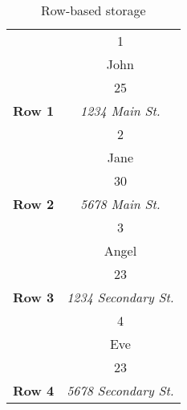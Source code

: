 \begin{table}[ht]
    \centering
    \begin{tabular}{|c|c|}
        \hline
        \multicolumn{1}{|l|}{\cellcolor[HTML]{EFEFEF}}                                 & 1                           \\ \cline{2-2}
        \multicolumn{1}{|l|}{\cellcolor[HTML]{EFEFEF}}                                 & John                        \\ \cline{2-2}
        \multicolumn{1}{|l|}{\cellcolor[HTML]{EFEFEF}}                                 & 25                          \\ \cline{2-2}
        \multicolumn{1}{|c|}{\multirow{-4}{*}{\cellcolor[HTML]{EFEFEF}\textbf{Row 1}}} & \textit{1234 Main St.}      \\ \hline
        \multicolumn{1}{|l|}{\cellcolor[HTML]{EFEFEF}}                                 & 2                           \\ \cline{2-2}
        \multicolumn{1}{|l|}{\cellcolor[HTML]{EFEFEF}}                                 & Jane                        \\ \cline{2-2}
        \multicolumn{1}{|l|}{\cellcolor[HTML]{EFEFEF}}                                 & 30                          \\ \cline{2-2}
        \multicolumn{1}{|c|}{\multirow{-4}{*}{\cellcolor[HTML]{EFEFEF}\textbf{Row 2}}} & \textit{5678 Main St.}      \\ \hline
        \multicolumn{1}{|l|}{\cellcolor[HTML]{EFEFEF}}                                 & 3                           \\ \cline{2-2}
        \multicolumn{1}{|l|}{\cellcolor[HTML]{EFEFEF}}                                 & Angel                       \\ \cline{2-2}
        \multicolumn{1}{|l|}{\cellcolor[HTML]{EFEFEF}}                                 & 23                          \\ \cline{2-2}
        \multicolumn{1}{|c|}{\multirow{-4}{*}{\cellcolor[HTML]{EFEFEF}\textbf{Row 3}}} & \textit{1234 Secondary St.} \\ \hline
        \multicolumn{1}{|l|}{\cellcolor[HTML]{EFEFEF}}                                 & 4                           \\ \cline{2-2}
        \multicolumn{1}{|l|}{\cellcolor[HTML]{EFEFEF}}                                 & Eve                         \\ \cline{2-2}
        \multicolumn{1}{|l|}{\cellcolor[HTML]{EFEFEF}}                                 & 23                          \\ \cline{2-2}
        \multicolumn{1}{|c|}{\multirow{-4}{*}{\cellcolor[HTML]{EFEFEF}\textbf{Row 4}}} & \textit{5678 Secondary St.} \\ \hline
    \end{tabular}
    \caption{Row-based storage}
\end{table}

